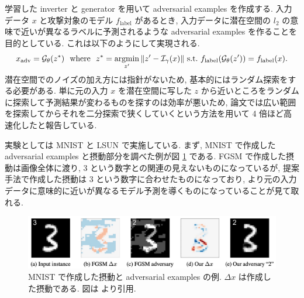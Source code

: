 学習した inverter と generator を用いて adversarial examples を作成する.
入力データ $x$ と攻撃対象のモデル $f_{\text{label}}$ があるとき, 入力データに潜在空間の $l_2$ の意味で近いが異なるラベルに予測されるような adversarial examples を作ることを目的としている.
これは以下のようにして実現される.
%
\begin{eqnarray}
x_{\text{adv}} = \mathcal{G}_{\theta} (z^*) \ \ \text{where} \ \ z^* = \argmin_{z'} \| z' - \mathcal{I}_{\gamma} (x) \| \ \text{s.t.} \ f_{\text{label}} (\mathcal{G}_{\theta} (z')) = f_{\text{label}} (x).
\label{eq:search-adversarial-example}
\end{eqnarray}
%
潜在空間でのノイズの加え方には指針がないため, 基本的にはランダム探索をする必要がある.
単に元の入力 $x$ を潜在空間に写した $z$ から近いところをランダムに探索して予測結果が変わるものを探すのは効率が悪いため, 論文では広い範囲を探索してからそれを二分探索で狭くしていくという方法を用いて 4 倍ほど高速化したと報告している.

実験としては MNIST と LSUN \cite{yu2015lsun} で実施している.
まず, MNIST で作成した adversarial examples と摂動部分を調べた例が図 \ref{fig:generating-natural-mnist} である.
FGSM で作成した摂動は画像全体に渡り, 3 という数字との関連の見えないものになっているが, 提案手法で作成した摂動は 3 という数字に合わせたものになっており, より元の入力データに意味的に近いが異なるモデル予測を導くものになっていることが見て取れる.
%
\begin{figure}[htbp]
\begin{center}
\includegraphics[width=14.0cm]{figures/generating-natural-mnist.pdf}
\end{center}
\caption{
MNIST で作成した摂動と adversarial examples の例.
$\Delta x$ は作成した摂動である.
図は \cite{zhao2017generating} より引用.
}
\label{fig:generating-natural-mnist}
\end{figure}
%


